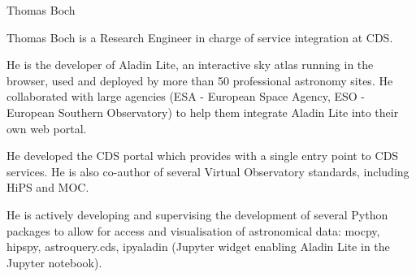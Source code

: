 \begin{participant}[type=R,PM=3,gender=male]{Thomas Boch}




  \par Thomas Boch is a Research Engineer in charge of service integration at CDS.

  \par He is the developer of Aladin Lite, an interactive sky atlas running in the browser, used and deployed by more than 50 professional astronomy sites. He collaborated with large agencies (ESA - European Space Agency, ESO - European Southern Observatory) to help them integrate Aladin Lite into their own web portal.

  \par He developed the CDS portal which provides with a single entry point to CDS services. He is also co-author of several Virtual Observatory standards, including HiPS and MOC.

  \par He is actively developing and supervising the development of several Python packages to allow for access and visualisation of astronomical data: mocpy, hipspy, astroquery.cds, ipyaladin (Jupyter widget enabling Aladin Lite in the Jupyter notebook).


\end{participant}

